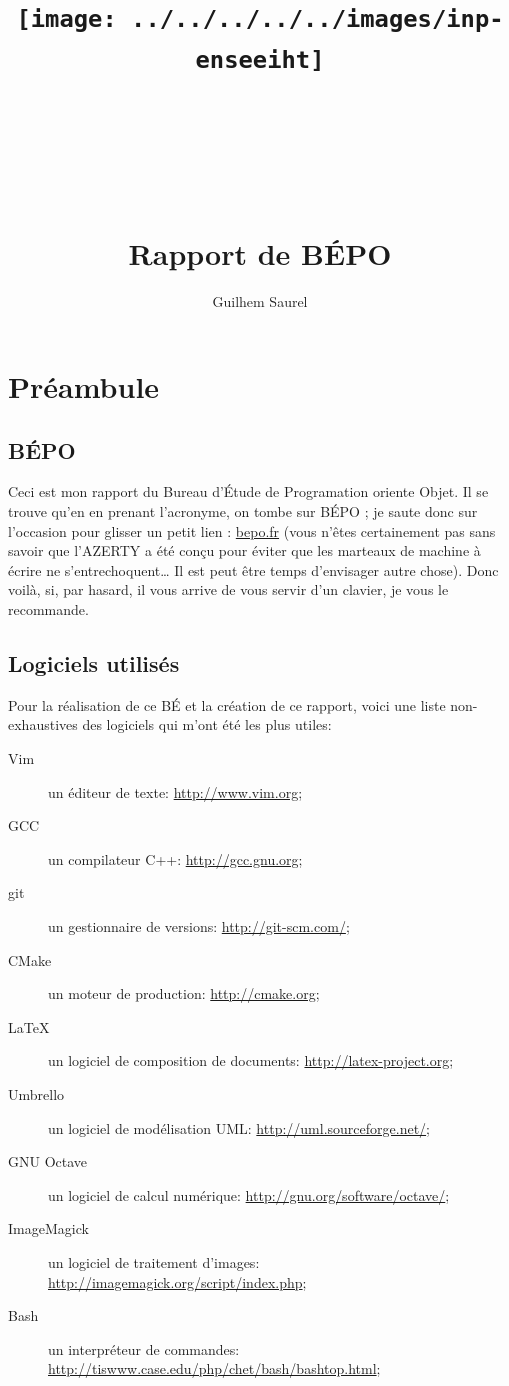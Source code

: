 \documentclass{report}
\title{\texttt{[image: ../../../../../images/inp-enseeiht]} \\ ~ \\ ~ \\ ~ \\ ~ \\ Rapport de BÉPO}
\author{Guilhem Saurel}
\date{\oldstylenums{\today}}
\begin{document}
\begin{titlepage}
    \setcounter{page}{0}
    \maketitle
    \thispagestyle{empty}
\end{titlepage}

\tableofcontents
\newpage



\chapter*{Préambule}
\section{BÉPO}
Ceci est mon rapport du Bureau d’Étude de Programation oriente Objet. Il se trouve qu’en en prenant
l’acronyme, on tombe sur BÉPO ; je saute donc sur l’occasion pour glisser un petit lien : \url{bepo.fr}
(vous n’êtes certainement pas sans savoir que l’AZERTY a été conçu pour éviter que les marteaux de 
machine à écrire ne s’entrechoquent… Il est peut être temps d’envisager autre chose). Donc voilà, si,
par hasard, il vous arrive de vous servir d’un clavier, je vous le recommande.

\section{Logiciels utilisés}
Pour la réalisation de ce BÉ et la création de ce rapport, voici une liste non-exhaustives des 
logiciels qui m’ont été les plus utiles:
\begin{description}
    \item[Vim] un éditeur de texte: \url{http://www.vim.org};
    \item[GCC] un compilateur C++: \url{http://gcc.gnu.org};
    \item[git] un gestionnaire de versions: \url{http://git-scm.com/};
    \item[CMake] un moteur de production: \url{http://cmake.org};
    \item[\LaTeX] un logiciel de composition de documents: \url{http://latex-project.org};
    \item[Umbrello] un logiciel de modélisation UML: \url{http://uml.sourceforge.net/};
    \item[GNU Octave] un logiciel de calcul numérique: \url{http://gnu.org/software/octave/};
    \item[ImageMagick] un logiciel de traitement d’images: \url{http://imagemagick.org/script/index.php};
    \item[Bash] un interpréteur de commandes: \url{http://tiswww.case.edu/php/chet/bash/bashtop.html};
\end{description}
\end{document}
